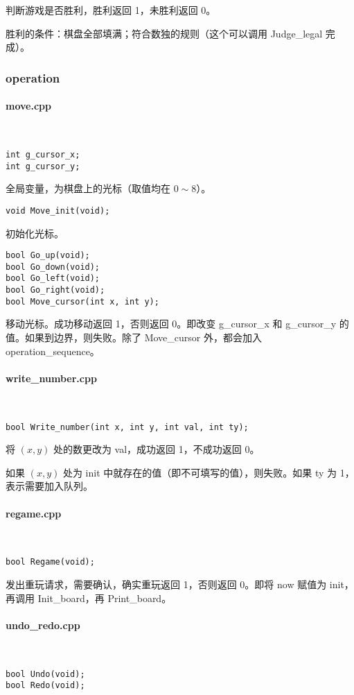 \documentclass{article}
\newcommand{\subsubsubsection}[1]{\paragraph{#1}\mbox{}\\}
\begin{document}
    判断游戏是否胜利，胜利返回 1，未胜利返回 0。

    胜利的条件：棋盘全部填满；符合数独的规则（这个可以调用 Judge\_legal 完成）。


    \subsubsection{operation}

    \subsubsubsection{move.cpp}

    \begin{lstlisting}
int g_cursor_x;
int g_cursor_y;
    \end{lstlisting}

    全局变量，为棋盘上的光标（取值均在 $0\sim 8$）。

    \begin{lstlisting}
void Move_init(void);
    \end{lstlisting}

    初始化光标。

    \begin{lstlisting}
bool Go_up(void);
bool Go_down(void);
bool Go_left(void);
bool Go_right(void);
bool Move_cursor(int x, int y);
    \end{lstlisting}

    移动光标。成功移动返回 1，否则返回 0。即改变 g\_cursor\_x 和 g\_cursor\_y 的值。如果到边界，则失败。除了 Move\_cursor 外，都会加入 operation\_sequence。

    \subsubsubsection{write\_number.cpp}

    \begin{lstlisting}
bool Write_number(int x, int y, int val, int ty);
    \end{lstlisting}

    将 $(x, y)$ 处的数更改为 val，成功返回 1，不成功返回 0。

    如果 $(x, y)$ 处为 init 中就存在的值（即不可填写的值），则失败。如果 ty 为 1，表示需要加入队列。

    \subsubsubsection{regame.cpp}

    \begin{lstlisting}
bool Regame(void);
    \end{lstlisting}

    发出重玩请求，需要确认，确实重玩返回 1，否则返回 0。即将 now 赋值为 init，再调用 Init\_board，再 Print\_board。

    \subsubsubsection{undo\_redo.cpp}

    \begin{lstlisting}
bool Undo(void);
bool Redo(void);
    \end{lstlisting}
\end{document}
